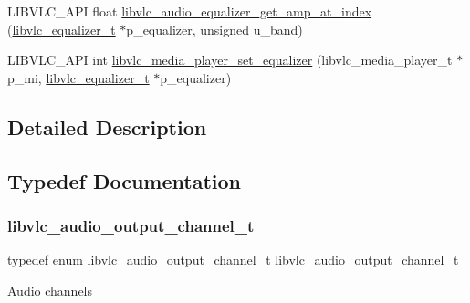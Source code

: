 \begin{DoxyCompactItemize}
\item 
L\+I\+B\+V\+L\+C\+\_\+\+A\+PI float \hyperlink{group__libvlc__audio_gaa8947288ffe0d92a486e8da51ae8c3fb}{libvlc\+\_\+audio\+\_\+equalizer\+\_\+get\+\_\+amp\+\_\+at\+\_\+index} (\hyperlink{group__libvlc__media__player_ga1ea141a84d68d0147fc58d99bfc83ab7}{libvlc\+\_\+equalizer\+\_\+t} $\ast$p\+\_\+equalizer, unsigned u\+\_\+band)
\item 
L\+I\+B\+V\+L\+C\+\_\+\+A\+PI int \hyperlink{group__libvlc__audio_ga0d355443d391d0bc2dafe9b6963a8f53}{libvlc\+\_\+media\+\_\+player\+\_\+set\+\_\+equalizer} (libvlc\+\_\+media\+\_\+player\+\_\+t $\ast$p\+\_\+mi, \hyperlink{group__libvlc__media__player_ga1ea141a84d68d0147fc58d99bfc83ab7}{libvlc\+\_\+equalizer\+\_\+t} $\ast$p\+\_\+equalizer)
\end{DoxyCompactItemize}


\subsection{Detailed Description}


\subsection{Typedef Documentation}
\mbox{\label{group__libvlc__audio_ga7f84a7c868f1111778ef7e9e30bc3690}} 
\subsubsection{\texorpdfstring{libvlc\+\_\+audio\+\_\+output\+\_\+channel\+\_\+t}{libvlc\_audio\_output\_channel\_t}}
{\footnotesize\ttfamily typedef enum \hyperlink{group__libvlc__audio_ga50e752d67eaa2738e0f914805b1b3a05}{libvlc\+\_\+audio\+\_\+output\+\_\+channel\+\_\+t}  \hyperlink{group__libvlc__audio_ga50e752d67eaa2738e0f914805b1b3a05}{libvlc\+\_\+audio\+\_\+output\+\_\+channel\+\_\+t}}

Audio channels \mbox{\label{group__libvlc__audio_ga059f2f96f5c47f3b7878e21b4d879613}} 
